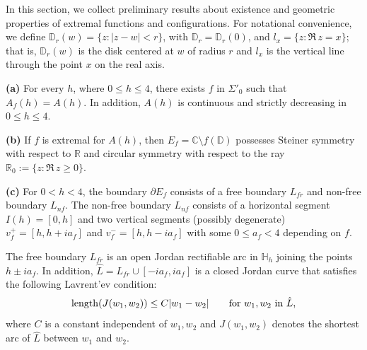 \documentclass[mn,a4paper,fleqn]{w-art}
\newcommand{\be}{\begin{equation}}
\newcommand{\ee}{\end{equation}}
\newcommand{\bl}{\begin{lemma}}
\newcommand{\el}{\end{lemma}}
\newcommand{\DD}{{\mathbb{D}}}
\begin{document}
In this section, we collect preliminary results about existence
and geometric properties of extremal functions and configurations.  For notational
convenience, we define $\DD_r(w) = \{z : |z-w|<r \}$, with $\DD_r = \DD_r(0)$, and 
$l_x = \{z : \Re \,z=x \}$; that is, $\DD_r(w)$ is the disk centered at $w$ of radius $r$
and $l_x$ is the vertical line through the point $x$ on the real axis.

\bl \label{Lemma 2.1}  %
\textbf{(a)} For every $h$, where $0\le h\le 4$, there exists $f$ in
$\Sigma'_0$ such that $A_f(h)=A(h)$. In addition, $A(h)$ is
continuous and strictly decreasing in  $0\le h\le 4$.

\textbf{(b)} If $f$ is extremal for $A(h)$, then
$E_f=\mathbb{C}\setminus f(\mathbb{D})$ possesses Steiner symmetry
with respect to $\mathbb{R}$ and circular symmetry with respect to the ray
$\mathbb{R}_0 := \{z : \Re\,z \ge 0 \}$.

\textbf{(c)} For $0<h<4$, the boundary $\partial E_f$ consists of
a free boundary $L_{fr}$ and non-free boundary $L_{nf}$. The
non-free boundary $L_{nf}$ consists of a horizontal segment
$I(h)=[0,h]$ and two vertical segments (possibly degenerate)
$v_f^+=[h,h+ia_f]$ and $v_f^-=[h,h-ia_f]$ with some $0\le a_f<4$
depending on $f$.

The free boundary $L_{fr}$ is an open Jordan rectifiable arc
in $\mathbb{H}_h$ joining the points $h\pm ia_f$.  %
In addition, $\hat L=L_{fr}\cup [-ia_f,ia_f]$ is a closed Jordan
curve that satisfies the following Lavrent'ev condition:
\be \label{equation Lem1} %
{\rm{length}}(J(w_1,w_2))\le C|w_1-w_2| \quad \quad {\mbox{for
$w_1,w_2$ in $\hat L$,}} %
\ee  %
where $C$ is a constant independent of $w_1,w_2$ and $J(w_1,w_2)$
denotes the shortest arc of $\hat L$ between $w_1$ and $w_2$.
\el  %
\end{document}
